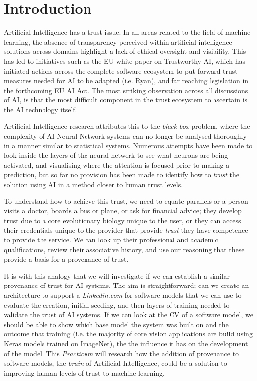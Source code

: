 \section{Introduction}
Artificial Intelligence has a trust issue. In all areas related to the field of machine learning, the absence of transparency perceived within artificial intelligence solutions across domains highlight a lack of ethical oversight and visibility. This has led to initiatives such as the EU white paper on Trustworthy AI\cite{high-levelexpertgrouponaiEthicsGuidelinesTrustworthy2019}, which has initiated actions across the complete software ecosystem to put forward trust measures needed for AI to be adapted (i.e. Ryan\cite{ryanAIWeTrust2020}), and far reaching legislation in the forthcoming EU AI Act. The most striking observation across all discussions of AI, is that the most difficult component in the trust ecosystem to ascertain is the AI technology itself.

Artificial Intelligence research attributes this to the \textit{black box} problem\cite{adadiPeekingBlackBoxSurvey2018}, where the complexity of AI Neural Network systems can no longer be analysed thoroughly in a manner similar to statistical systems. Numerous attempts have been made to look inside the layers of the neural network to see what neurons are being activated\cite{kimInterpretabilityFeatureAttribution2018}, and visualising where the attention is focused prior to making a prediction, but so far no provision has been made to identify how to \textit{trust} the solution using AI in a method closer to human trust levels.

To understand how to achieve this trust, we need to equate parallels or a person visits a doctor, boards a bus or plane, or ask for financial advice; they develop trust due to a core evolutionary biology unique to the user, or they can access their credentials unique to the provider that provide \textit{trust} they have competence to provide the service. We can look up their professional and academic qualifications, review their associative history, and use our reasoning that these provide a basis for a provenance of trust.

It is with this analogy that we will investigate if we can establish a similar provenance of trust for AI systems. The aim is straightforward; can we create an architecture to support a \textit{Linkedin.com} for software models that we can use to evaluate the creation, initial seeding, and then layers of training needed to validate the trust of AI systems. If we can look at the CV of a software model, we should be able to show which base model the system was built on and the outcome that training (i.e. the majority of core vision applications are build using Keras models trained on ImageNet\cite{dengImageNetLargescaleHierarchical2009}), the the influence it has on the development of the model. This \textit{Practicum} will research how the addition of provenance to software models, the \textit{brain} of Artificial Intelligence, could be a solution to improving human levels of trust\cite{mcleodTrust2020} to machine learning.

